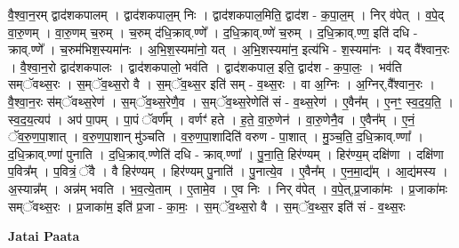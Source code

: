 \documentclass[17pt]{extarticle}
\begin{document}
वै॒श्वा॒न॒रम् द्वाद॑शकपालम् । द्वाद॑शकपाल॒म् निः । द्वाद॑शकपाल॒मिति॒ द्वाद॑श - क॒पा॒ल॒म् । निर् व॑पेत् । व॒पे॒द् वा॒रु॒णम् । वा॒रु॒णम् च॒रुम् । च॒रुम् द॑धि॒क्राव्.ण्णे᳚ । द॒धि॒क्राव्.ण्णे॑ च॒रुम् । द॒धि॒क्राव्.ण्ण॒ इति॑ दधि - क्राव्.ण्णे᳚ । च॒रुम॑भिश॒स्यमा॑नः । अ॒भि॒श॒स्यमा॑नो॒ यत् । अ॒भि॒॒शस्यमा॑न॒ इत्य॑भि - श॒स्यमा॑नः । यद् वै᳚श्वान॒रः । वै॒श्वा॒न॒रो द्वाद॑शकपालः । द्वाद॑शकपालो॒ भव॑ति । द्वाद॑शकपाल॒ इति॒ द्वाद॑श - क॒पा॒लः॒ । भव॑ति सम्ॅवथ्स॒रः । स॒म्ॅव॒थ्स॒रो वै । स॒म्ॅव॒थ्स॒र इति॑ सम् - व॒थ्स॒रः । वा अ॒ग्निः । अ॒ग्निर्,वै᳚श्वान॒रः । वै॒श्वा॒न॒रः स॑म्ॅवथ्स॒रेण॑ । स॒म्ॅव॒थ्स॒रेणै॒व । स॒म्ॅव॒थ्स॒रेणेति॑ सं - व॒थ्स॒रेण॑ । ए॒वैन᳚म् । ए॒नꣳ॒॒ स्व॒द॒य॒ति॒ । स्व॒द॒य॒त्यप॑ । अप॑ पा॒पम् । पा॒पं ॅवर्ण᳚म् । वर्णꣳ॑ हते । ह॒ते॒ वा॒रु॒णेन॑ । वा॒रु॒णेनै॒व । ए॒वैन᳚म् । ए॒नं॒ ॅव॒रु॒ण॒पा॒शात् । व॒रु॒ण॒पा॒शान् मु॑ञ्चति । व॒रु॒ण॒पा॒शादिति॑ वरुण - पा॒शात् । मु॒ञ्च॒ति॒ द॒धि॒क्राव्.ण्णा᳚ । द॒धि॒क्राव्.ण्णा॑ पुनाति । द॒धि॒क्राव्.ण्णेति॑ दधि - क्राव्.ण्णा᳚ । पु॒ना॒ति॒ हिर॑ण्यम् । हिर॑ण्य॒म् दक्षि॑णा । दक्षि॑णा प॒वित्र᳚म् । प॒वित्रं॒ ॅवै । वै हिर॑ण्यम् । हिर॑ण्यम् पु॒नाति॑ । पु॒नात्ये॒व । ए॒वैन᳚म् । ए॒न॒मा॒द्य᳚म् । आ॒द्य॑मस्य । अ॒स्यान्न᳚म् । अन्न॑म् भवति । भ॒व॒त्ये॒ताम् । ए॒तामे॒व । ए॒व निः । निर् व॑पेत् । व॒पे॒त्,प्र॒जाका॑मः । प्र॒जाका॑मः सम्ॅवथ्स॒रः । प्र॒जाका॑म॒ इति॑ प्र॒जा - का॒मः॒ । स॒म्ॅव॒थ्स॒रो वै । स॒म्ॅव॒थ्स॒र इति॑ सं - व॒थ्स॒रः \newline

\textbf{Jatai Paata} \newline
\end{document}
